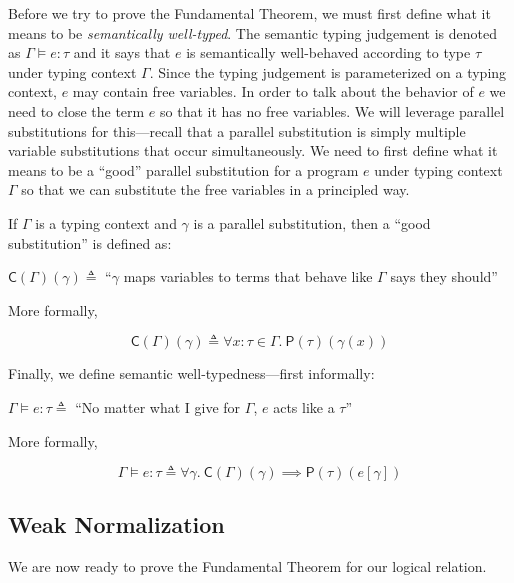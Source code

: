 \documentclass{lecturenotes}
\newcommand{\lr}[2]{\ensuremath{\mathsf{P}(#1)(#2)}}
\newcommand{\gdsubst}[2]{\ensuremath{\mathsf{C}(#1)(#2)}}
\begin{document}
Before we try to prove the Fundamental Theorem, we must first define what it means to be \emph{semantically well-typed}.
The semantic typing judgement is denoted as $\Gamma \vDash e : \tau$ and it says that $e$ is semantically well-behaved according to type $\tau$ under typing context $\Gamma$.
Since the typing judgement is parameterized on a typing context, $e$ may contain free variables.
In order to talk about the behavior of $e$ we need to close the term $e$ so that it has no free variables.
We will leverage parallel substitutions for this---recall that a parallel substitution is simply multiple variable substitutions that occur simultaneously.
We need to first define what it means to be a ``good'' parallel substitution for a program $e$ under typing context $\Gamma$ so that we can substitute the free variables in a principled way.

If $\Gamma$ is a typing context and $\gamma$ is a parallel substitution, then a ``good substitution'' is defined as: \\

\begin{center}
  $\gdsubst{\Gamma}{\gamma} \triangleq$ ``$\gamma$ maps variables to terms that behave like $\Gamma$ says they should''
\end{center}

More formally,

$$\gdsubst{\Gamma}{\gamma} \triangleq \forall x : \tau \in \Gamma.~\lr{\tau}{\gamma(x)}$$

Finally, we define semantic well-typedness---first informally: \\

\begin{center}
  $\Gamma \vDash e : \tau \triangleq$ ``No matter what I give for $\Gamma$, $e$ acts like a $\tau$''
\end{center}

More formally,

$$\Gamma \vDash e : \tau \triangleq \forall \gamma.~\gdsubst{\Gamma}{\gamma} \implies \lr{\tau}{e[\gamma]}$$

\subsection{Weak Normalization}

We are now ready to prove the Fundamental Theorem for our logical relation.
\end{document}
